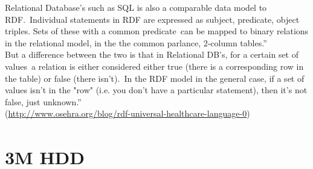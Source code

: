 \documentclass[DIV=calc, paper=a4, fontsize=12pt, onecolumn]{scrartcl}	 %
\begin{document}
Relational Database’s such as SQL is also a comparable data model to RDF.\
Individual statements in RDF are expressed as subject, predicate, object triples. Sets of these with a common predicate\
 can be mapped to binary relations in the relational model, in the the common parlance, 2-column tables.”\\

But a difference between the two is that in Relational DB's, for a certain set of values\
a relation is either considered either true (there is a corresponding row in the table) or false (there isn't).\
 In the RDF model in the general case, if a set of values isn't in the "row" (i.e. you don't have a particular statement), then it's not false, just unknown.”\\

 (\url{http://www.osehra.org/blog/rdf-universal-healthcare-language-0})\\



\section[3M\textsuperscript{\texttrademark} Healthcare Data Dictionary (HDD)]
{3M HDD\textsuperscript{\texttrademark}}
  \label{sec:hdd}
  
\end{document}

